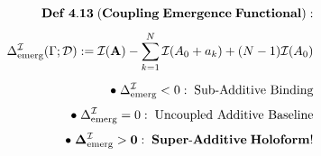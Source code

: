 \documentclass[preview]{standalone}
\begin{document}
\begin{align*}
\special{dvisvgm:raw <g id='unique000'>}\mathbf{Def\;4.13\;(Coupling\;Emergence\;Functional):}\\[4pt]\Delta_{\text{emerg}}^{\mathcal{I}}(\Gamma;\mathcal{D}) := \mathcal{I}(\mathbf{A}) - \sum_{k=1}^N \mathcal{I}(A_0+a_k) + (N-1)\mathcal{I}(A_0)\\[5pt]\bullet\;\Delta_{\text{emerg}}^{\mathcal{I}} < 0:\;\text{Sub-Additive Binding}\\[3pt]\bullet\;\Delta_{\text{emerg}}^{\mathcal{I}} = 0:\;\text{Uncoupled Additive Baseline}\\[3pt]\bullet\;\mathbf{\Delta_{\text{emerg}}^{\mathcal{I}} > 0:\;Super\text{-}Additive\;Holoform!}\special{dvisvgm:raw </g>}
\end{align*}
\end{document}
